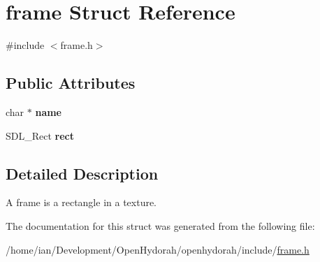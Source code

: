 \hypertarget{structframe}{\section{frame Struct Reference}
\label{structframe}
}


{\ttfamily \#include $<$frame.\-h$>$}

\subsection*{Public Attributes}
\begin{DoxyCompactItemize}
\item 
\hypertarget{structframe_a8ba63fca37efc0e1742ab3fb13572d17}{char $\ast$ {\bfseries name}}\label{structframe_a8ba63fca37efc0e1742ab3fb13572d17}

\item 
\hypertarget{structframe_a5be79db054d53493f4e35a3108c0959e}{S\-D\-L\-\_\-\-Rect {\bfseries rect}}\label{structframe_a5be79db054d53493f4e35a3108c0959e}

\end{DoxyCompactItemize}


\subsection{Detailed Description}
A frame is a rectangle in a texture. 

The documentation for this struct was generated from the following file\-:\begin{DoxyCompactItemize}
\item 
/home/ian/\-Development/\-Open\-Hydorah/openhydorah/include/\hyperlink{frame_8h}{frame.\-h}\end{DoxyCompactItemize}
